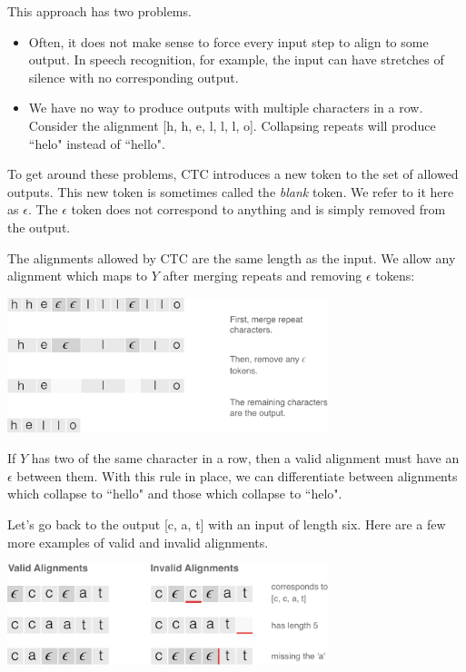 This approach has two problems.
\begin{itemize}
\item Often, it does not make sense to force every input step to align to some
output. In speech recognition, for example, the input can have stretches of
silence with no corresponding output.
\item We have no way to produce outputs with multiple characters in a row.
Consider the alignment [h, h, e, l, l, l, o]. Collapsing repeats will produce
``helo" instead of ``hello".
\end{itemize}

To get around these problems, CTC introduces a new token to the set of allowed
outputs. This new token is sometimes called the {\it blank} token. We refer to
it here as $\epsilon$. The $\epsilon$ token does not correspond to anything and
is simply removed from the output.

The alignments allowed by CTC are the same length as the input. We allow any
alignment which maps to $Y$ after merging repeats and removing $\epsilon$
tokens:

\begin{center}
\includegraphics[width=0.7\textwidth]{background/figures/alignment_steps.pdf}
\end{center}

If $Y$ has two of the same character in a row, then a valid alignment must have
an $\epsilon$ between them. With this rule in place, we can differentiate
between alignments which collapse to ``hello" and those which collapse to
``helo".

Let's go back to the output [c, a, t] with an input of length six. Here are
a few more examples of valid and invalid alignments.

\begin{center}
\includegraphics[width=0.7\textwidth]{background/figures/valid_invalid_alignments.pdf}
\end{center}

